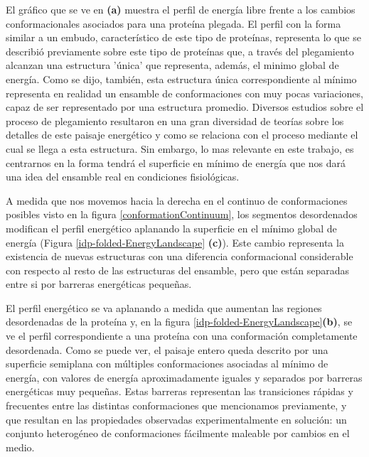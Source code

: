El gráfico que se ve en \textbf{(a)} muestra el perfil de energía libre frente a los cambios conformacionales asociados para una proteína plegada.
El perfil con la forma similar a un embudo, característico de este tipo de proteínas, representa lo que se describió previamente sobre este tipo de proteínas que, a través del plegamiento alcanzan una estructura 'única' que 
representa, además, el minimo global de energía. 
Como se dijo, también, esta estructura única correspondiente al mínimo representa en realidad un ensamble de conformaciones con muy pocas variaciones, capaz de ser representado por una estructura promedio.
Diversos estudios sobre el proceso de plegamiento resultaron en una gran diversidad de teorías sobre los detalles de este paisaje energético y como se relaciona con el proceso mediante el cual se llega a esta estructura.
Sin embargo, lo mas relevante en este trabajo, es centrarnos en la forma tendrá el superficie en mínimo de energía que nos dará una idea del ensamble real en condiciones fisiológicas.


A medida que nos movemos hacia la derecha en el continuo de conformaciones posibles visto en la figura \ref{conformationContinuum}, los segmentos desordenados modifican el perfil energético aplanando la superficie en el mínimo global de energía
(Figura \ref{idp-folded-EnergyLandscape} \textbf{(c)}). Este cambio representa la existencia de nuevas estructuras con una diferencia conformacional considerable con respecto al resto de las estructuras del ensamble, 
pero que están separadas entre si por barreras energéticas pequeñas. 

El perfil energético se va aplanando a medida que aumentan las regiones desordenadas de la proteína y, en la figura \ref{idp-folded-EnergyLandscape}\textbf{(b)}, se ve el perfil 
correspondiente a una proteína con una conformación completamente desordenada. 
Como se puede ver, el paisaje entero queda descrito por una superficie semiplana con múltiples conformaciones asociadas al mínimo de energía, con valores de energía aproximadamente iguales y separados por barreras energéticas muy pequeñas.
Estas barreras representan las transiciones rápidas y frecuentes entre las distintas conformaciones que mencionamos previamente, y que resultan en las propiedades observadas experimentalmente
en solución: un conjunto heterogéneo de conformaciones fácilmente maleable por cambios en el medio. 

